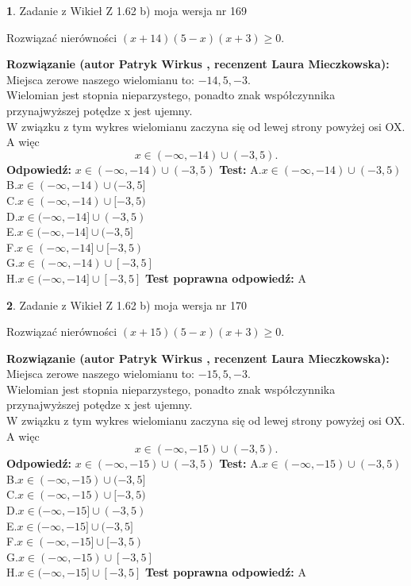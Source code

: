 \documentclass[12pt, a4paper]{article}
\theoremstyle{definition} %
\newtheorem{zad}{}
\newcommand{\zadStart}[1]{\begin{zad}#1\newline}
\newcommand{\zadStop}{\end{zad}}
\newcommand{\rozwStart}[2]{\noindent \textbf{Rozwiązanie (autor #1 , recenzent #2): }\newline}
\newcommand{\rozwStop}{\newline}
\newcommand{\odpStart}{\noindent \textbf{Odpowiedź:}\newline}
\newcommand{\odpStop}{\newline}
\newcommand{\testStart}{\noindent \textbf{Test:}\newline}
\newcommand{\testStop}{\newline}
\newcommand{\kluczStart}{\noindent \textbf{Test poprawna odpowiedź:}\newline}
\newcommand{\kluczStop}{\newline}
\begin{document}
\zadStart{Zadanie z Wikieł Z 1.62 b) moja wersja nr 169}

Rozwiązać nierówności $(x+14)(5-x)(x+3)\ge0$.
\zadStop
\rozwStart{Patryk Wirkus}{Laura Mieczkowska}
Miejsca zerowe naszego wielomianu to: $-14, 5, -3$.\\
Wielomian jest stopnia nieparzystego, ponadto znak współczynnika przy\linebreak najwyższej potędze x jest ujemny.\\ W związku z tym wykres wielomianu zaczyna się od lewej strony powyżej osi OX. A więc $$x \in (-\infty,-14) \cup (-3,5).$$
\rozwStop
\odpStart
$x \in (-\infty,-14) \cup (-3,5)$
\odpStop
\testStart
A.$x \in (-\infty,-14) \cup (-3,5)$\\
B.$x \in (-\infty,-14) \cup (-3,5]$\\
C.$x \in (-\infty,-14) \cup [-3,5)$\\
D.$x \in (-\infty,-14] \cup (-3,5)$\\
E.$x \in (-\infty,-14] \cup (-3,5]$\\
F.$x \in (-\infty,-14] \cup [-3,5)$\\
G.$x \in (-\infty,-14) \cup [-3,5]$\\
H.$x \in (-\infty,-14] \cup [-3,5]$
\testStop
\kluczStart
A
\kluczStop



\zadStart{Zadanie z Wikieł Z 1.62 b) moja wersja nr 170}

Rozwiązać nierówności $(x+15)(5-x)(x+3)\ge0$.
\zadStop
\rozwStart{Patryk Wirkus}{Laura Mieczkowska}
Miejsca zerowe naszego wielomianu to: $-15, 5, -3$.\\
Wielomian jest stopnia nieparzystego, ponadto znak współczynnika przy\linebreak najwyższej potędze x jest ujemny.\\ W związku z tym wykres wielomianu zaczyna się od lewej strony powyżej osi OX. A więc $$x \in (-\infty,-15) \cup (-3,5).$$
\rozwStop
\odpStart
$x \in (-\infty,-15) \cup (-3,5)$
\odpStop
\testStart
A.$x \in (-\infty,-15) \cup (-3,5)$\\
B.$x \in (-\infty,-15) \cup (-3,5]$\\
C.$x \in (-\infty,-15) \cup [-3,5)$\\
D.$x \in (-\infty,-15] \cup (-3,5)$\\
E.$x \in (-\infty,-15] \cup (-3,5]$\\
F.$x \in (-\infty,-15] \cup [-3,5)$\\
G.$x \in (-\infty,-15) \cup [-3,5]$\\
H.$x \in (-\infty,-15] \cup [-3,5]$
\testStop
\kluczStart
A
\kluczStop
\end{document}
